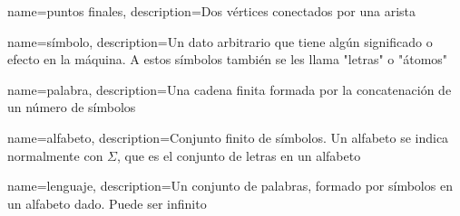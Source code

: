 
{
	name=puntos finales,
	description={Dos vértices conectados por una arista}
}

{
	name=símbolo,
	description={Un dato arbitrario que tiene algún significado o efecto en la máquina. A estos símbolos también se les llama "letras" o "átomos"}
}

{
	name=palabra,
	description={Una cadena finita formada por la concatenación de un número de símbolos}
}

{
	name=alfabeto,
	description={Conjunto finito de símbolos. Un alfabeto se indica normalmente con $\Sigma$, que es el conjunto de letras en un alfabeto}
}

{
	name=lenguaje,
	description={Un conjunto de palabras, formado por símbolos en un alfabeto dado. Puede ser infinito}
}